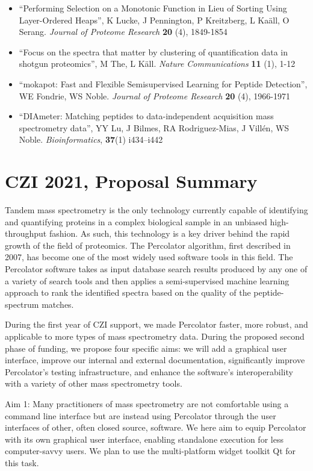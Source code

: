 \documentclass{article}
\begin{document}
\begin{itemize}
  \item ``Performing Selection on a Monotonic Function in Lieu of Sorting Using Layer-Ordered Heaps'',
  K Lucke, J Pennington, P Kreitzberg, L Ka\"{a}ll, O Serang.
  {\em Journal of Proteome Research} {\bf 20} (4), 1849-1854
  \item ``Focus on the spectra that matter by clustering of quantification data in shotgun proteomics'',
  M The, L K\"{a}ll.
  {\em Nature Communications} {\bf 11} (1), 1-12
  \item ``mokapot: Fast and Flexible Semisupervised Learning for Peptide Detection'',
  WE Fondrie, WS Noble.
  {\em Journal of Proteome Research} {\bf 20} (4), 1966-1971
  \item ``DIAmeter: Matching peptides to data-independent acquisition mass spectrometry data'',
  YY Lu, J Bilmes, RA Rodriguez-Mias, J Vill\'en, WS Noble. {\em Bioinformatics}, {\bf 37}(1) i434–i442
\end{itemize}

\section*{ CZI 2021, Proposal Summary}

Tandem mass spectrometry is the only technology currently capable of
identifying and quantifying proteins in a complex biological sample in
an unbiased high-throughput fashion. As such, this technology is a key
driver behind the rapid growth of the field of proteomics. The
Percolator algorithm, first described in 2007, has become one of the
most widely used software tools in this field. The Percolator software
takes as input database search results produced by any one of a
variety of search tools and then applies a semi-supervised machine
learning approach to rank the identified spectra based on the quality
of the peptide-spectrum matches.

During the first year of CZI support, we made Percolator faster, more
robust, and applicable to more types of mass spectrometry data. During
the proposed second phase of funding, we propose four specific aims:
we will add a graphical user interface, improve our internal and
external documentation, significantly improve Percolator's testing
infrastructure, and enhance the software's interoperability with a
variety of other mass spectrometry tools.

Aim 1: Many practitioners of mass spectrometry are not comfortable
using a command line interface but are instead using Percolator
through the user interfaces of other, often closed source, software.
We here aim to equip Percolator with its own graphical user interface,
enabling standalone execution for less computer-savvy users. We plan
to use the multi-platform widget toolkit Qt for this task.
\end{document}
